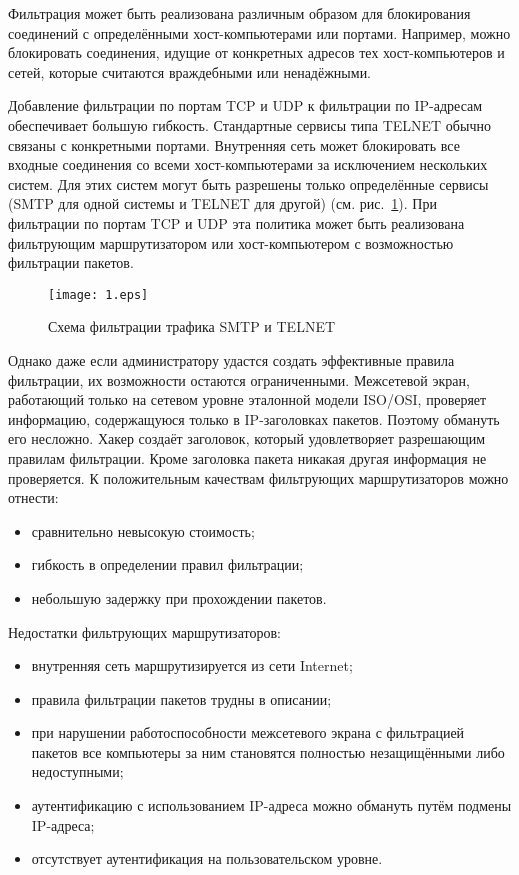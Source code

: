 Фильтрация может быть реализована различным образом для блокирования
соединений с определёнными хост-компьютерами или портами. Например,
можно блокировать соединения, идущие от конкретных адресов тех
хост-компьютеров и сетей, которые считаются враждебными или
ненадёжными.

Добавление фильтрации по портам TCP и UDP к фильтрации по IP-адресам
обеспечивает большую гибкость. Стандартные сервисы типа TELNET обычно
связаны с конкретными портами. Внутренняя сеть может блокировать все
входные соединения со всеми хост-компьютерами за исключением
нескольких систем. Для этих систем могут быть разрешены только
определённые сервисы (SMTP для одной системы и TELNET для другой)
(см. рис.~\ref{fig:gor:1}). При фильтрации по портам TCP и UDP эта
политика может быть реализована фильтрующим маршрутизатором или
хост-компьютером с возможностью фильтрации пакетов.

\begin{figure}[!htp]
\centerline{\texttt{[image: 1.eps]}}
\caption{Схема фильтрации трафика SMTP и TELNET}
\label{fig:gor:1}
\end{figure}

Однако даже если администратору удастся создать эффективные правила
фильтрации, их возможности остаются ограниченными. Межсетевой экран,
работающий только на сетевом уровне эталонной модели ISO/OSI,
проверяет информацию, содержащуюся только в IP-заголовках
пакетов. Поэтому обмануть его несложно. Хакер создаёт заголовок,
который удовлетворяет разрешающим правилам фильтрации. Кроме заголовка
пакета никакая другая информация не проверяется.  К положительным
качествам фильтрующих маршрутизаторов можно отнести:

\begin{itemize}
\item  сравнительно невысокую стоимость;
\item  гибкость в определении правил фильтрации;
\item  небольшую задержку при прохождении пакетов.
\end{itemize}

Недостатки фильтрующих маршрутизаторов:

\begin{itemize}
\item внутренняя сеть маршрутизируется из сети Internet;
\item правила фильтрации пакетов трудны в описании;
\item при нарушении работоспособности межсетевого экрана с
    фильтрацией пакетов все компьютеры за ним становятся полностью
    незащищёнными либо недоступными;
\item аутентификацию с использованием IP-адреса можно обмануть
    путём подмены IP-адреса;
\item отсутствует аутентификация на пользовательском уровне.
\end{itemize}

